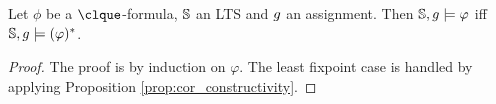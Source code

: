\begin{proposition}\label{thm:guard_wmso}
Let $\phi$ be a $\clque$-formula, $\mathbb{S}$ an LTS and $g$ an assignment.
Then $\mathbb{S}, g \models \varphi$ iff $\mathbb{S}, g \models (\varphi)^*$.
\end{proposition}
\begin{proof}
The proof is by induction on $\varphi$. The least fixpoint case is handled by applying Proposition \ref{prop:cor_constructivity}.
%

\end{proof}
